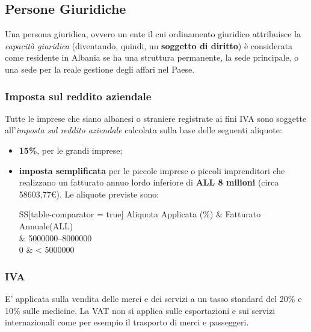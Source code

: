 \subsection[Persone Giuridiche]{Persone Giuridiche}
Una persona giuridica, ovvero un ente il cui ordinamento giuridico attribuisce la \textit{capacità giuridica} (diventando, quindi, un \textbf{soggetto di diritto}) è considerata come residente in Albania se ha una struttura permanente, la sede principale, o una sede per la reale gestione degli affari nel Paese.
\subsubsection{Imposta sul reddito aziendale} 
Tutte le imprese che siano albanesi o straniere registrate ai fini \ac{IVA} sono soggette all'\textit{imposta sul reddito aziendale} calcolata sulla base delle seguenti aliquote:
\begin{itemize}
	\item \textbf{15\%}, per le grandi imprese;
	\item \textbf{imposta semplificata} per le piccole imprese o piccoli imprenditori che realizzano un fatturato annuo lordo inferiore di \textbf{ALL 8 milioni} (circa 58603,77\euro). Le aliquote previste sono:
		\begin{center}
 			\begin{tabular}{SS[table-comparator = true]}
 			\toprule 
 				{Aliquota Applicata (\%)} & {Fatturato Annuale(ALL)} \\
 			 & \numrange{5000000}{8000000} \\
 				0 & < 5000000 \\
 			\bottomrule
 			\end{tabular} 
		\end{center}
\end{itemize} 
\subsubsection{IVA}
E' applicata sulla vendita delle merci e dei servizi a un tasso standard del 20\% e 10\% sulle medicine. La VAT non si applica sulle
esportazioni e sui servizi internazionali come per esempio il trasporto di merci e passeggeri.
